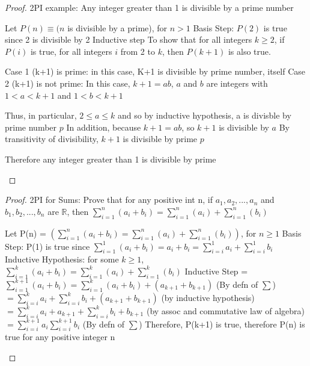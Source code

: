 \documentclass[a4paper]{article}
\theoremstyle{definition}
\begin{document}
\begin{proof}2PI example: Any integer greater than 1 is divisible by a prime number
  \begin{numpf*}
    \pfln Let $P(n) \equiv (n$ is divisible by a prime), for $n > 1$
    \pfln Basis Step: $P(2)$ is true since 2 is divisible by 2
    \pfln Inductive step To show that for all integers $k \geq 2$, if $P(i)$ is true, for all integers $i$ from 2 to $k$, then $P(k+1)$ is also true.
    \begin{subpf}
    \pfln Case 1 (k+1) is prime: in this case, K+1 is divisible by prime number, itself
    \pfln Case 2 (k+1) is not prime: In this case, $k+1 = ab$, $a$ and $b$ are integers with $1 < a < k+1$ and $1 < b < k+1$
    \begin{subpf}
      \pfln Thus, in particular, $2 \leq a \leq k$ and so by inductive hypothesis, a is divisble by prime number $p$
      \pfln In addition, because $k+1 = ab$, so $k+1$ is divisible by $a$
      \pfln By transitivity of divisibility, $k+1$ is divisible by prime $p$
    \end{subpf}
    \end{subpf}
    \pfln Therefore any integer greater than 1 is divisible by prime
  \end{numpf*}
\end{proof}

\begin{proof} 2PI for Sums: Prove that for any positive int n, if $a_1, a_2, ..., a_n$ and $b_1, b_2, ..., b_n$ are $\mathbb{R}$, then $\sum^n_{i=1}(a_i+b_i) = \sum^n_{i=1}(a_i) + \sum^n_{i=1}(b_i)$
  \begin{numpf*}
    \pfln Let P(n) = $(\sum^n_{i=1}(a_i+b_i) = \sum^n_{i=1}(a_i) + \sum^n_{i=1}(b_i))$, for $n \geq 1$
    \pfln Basis Step: P(1) is true since $\sum^{1}_{i=1}(a_i+b_i) = a_i + b_i = \sum^{1}_{i=i}a_i + \sum^{1}_{i=i}b_i$
    \pfln Inductive Hypothesis: for some $k \geq 1$, $\sum^k_{i=1}(a_i+b_i) = \sum^k_{i=1}(a_i) + \sum^k_{i=1}(b_i)$
    \pfln Inductive Step = $\sum^{k+1}_{i=1}(a_i+b_i) = \sum^k_{i=1}(a_i+b_i) + (a_{k+1} + b_{k+1})$ (By defn of $\sum$)\\
    $ = \sum^{k}_{i=i}a_i + \sum^{k}_{i=i}b_i + (a_{k+1} + b_{k+1})$ (by inductive hypothesis) \\
    $ = \sum^{k}_{i=i}a_i + a_{k+1} + \sum^{k}_{i=i}b_i + b_{k+1}$ (by assoc and commutative law of algebra)\\
    $ = \sum^{k+1}_{i=i}a_i  \sum^{k+1}_{i=i}b_i$ (By defn of $\sum$)
    \pfln Therefore, P(k+1) is true, therefore P(n) is true for any positive integer n
  \end{numpf*}
\end{proof}
\end{document}
